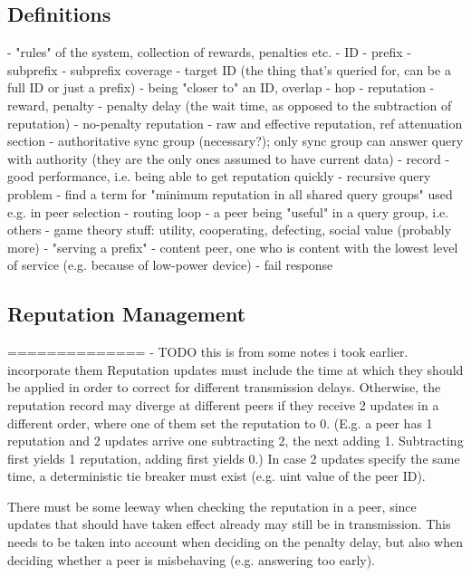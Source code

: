 \subsection{Definitions}
- "rules" of the system, collection of rewards, penalties etc.
- ID
- prefix
- subprefix
- subprefix coverage
- target ID (the thing that's queried for, can be a full ID or just a prefix)
- being "closer to" an ID, overlap
- hop
- reputation
- reward, penalty
- penalty delay (the wait time, as opposed to the subtraction of reputation)
- no-penalty reputation
- raw and effective reputation, ref attenuation section
- authoritative sync group (necessary?); only sync group can answer query with
  authority (they are the only ones assumed to have current data)
- record
- good performance, i.e. being able to get reputation quickly
- recursive query problem
- find a term for "minimum reputation in all shared query groups" used e.g. in
  peer selection
- routing loop
- a peer being "useful" in a query group, i.e. others
- game theory stuff: utility, cooperating, defecting, social value (probably
  more)
- "serving a prefix"
- content peer, one who is content with the lowest level of service (e.g.
  because of low-power device)
- fail response
\subsection{Reputation Management}
==============
- TODO this is from some notes i took earlier. incorporate them
Reputation updates must include the time at which they should be applied in
order to correct for different transmission delays. Otherwise, the reputation
record may diverge at different peers if they receive 2 updates in a different
order, where one of them set the reputation to 0. (E.g. a peer has 1 reputation
and 2 updates arrive one subtracting 2, the next adding 1. Subtracting first
yields 1 reputation, adding first yields 0.) In case 2 updates specify the same
time, a deterministic tie breaker must exist (e.g. uint value of the peer ID).

There must be some leeway when checking the reputation in a peer, since updates
that should have taken effect already may still be in transmission. This needs
to be taken into account when deciding on the penalty delay, but also when
deciding whether a peer is misbehaving (e.g. answering too early).

